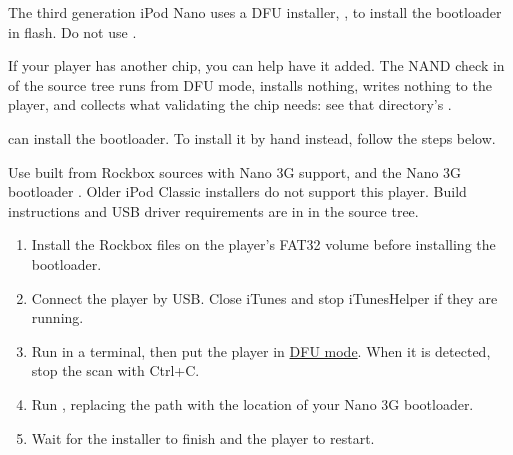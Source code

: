 The third generation iPod Nano uses a DFU installer, ,
to install the bootloader in flash. Do not use .


If your player has another chip, you can help have it added. The NAND check in  of the
source tree runs from DFU mode, installs nothing, writes nothing to the
player, and collects what validating the chip needs: see that
directory's .

 can install the bootloader. To install it by hand
instead, follow the steps below.

Use  built from Rockbox sources
with Nano 3G support, and the Nano 3G bootloader
. Older iPod Classic installers do not
support this player. Build instructions and USB driver requirements are
in  in the source tree.

\begin{enumerate}
\item Install the Rockbox files on the player's FAT32 volume before
installing the bootloader.
\item Connect the player by USB. Close iTunes and stop iTunesHelper if
they are running.
\item Run  in a terminal, then put the
player in
\href{https://freemyipod.org/wiki/Modes#Getting_DFU_mode_on_iPod_Classic.2C_Nano_3G_and_newer}{DFU mode}.
When it is detected, stop the scan with Ctrl+C.
\item Run ,
replacing the path with the location of your Nano 3G bootloader.
\item Wait for the installer to finish and the player to restart.
\end{enumerate}

